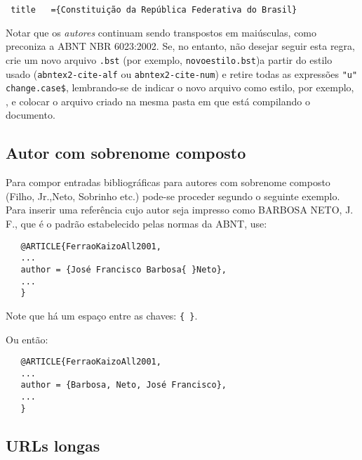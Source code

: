 \documentclass[a4paper]{ltxdoc}
\begin{document}
\begin{verbatim}
 title   ={Constituição da República Federativa do Brasil}
\end{verbatim}

Notar que os \textit{autores} continuam sendo transpostos em maiúsculas, como preconiza a ABNT NBR 6023:2002. Se, no entanto, não desejar seguir esta regra, crie um novo arquivo \verb|.bst| (por exemplo, \verb|novoestilo.bst|)a partir do estilo usado (\verb|abntex2-cite-alf| ou \verb|abntex2-cite-num|) e retire todas as expressões \verb|"u" change.case$|, lembrando-se de indicar o novo arquivo como estilo, por exemplo, \verb||, e colocar o arquivo criado na mesma pasta em que está compilando o documento.



\subsection{Autor com sobrenome composto}

Para compor entradas bibliográficas para autores com sobrenome composto (Filho, Jr.,Neto, Sobrinho etc.) pode-se proceder segundo o seguinte exemplo.
Para inserir uma referência cujo autor seja impresso como BARBOSA NETO, J. F., que é o padrão estabelecido pelas normas da ABNT, use:

\begin{verbatim}
   @ARTICLE{FerraoKaizoAll2001,
   ...
   author = {José Francisco Barbosa{ }Neto},
   ...
   }
\end{verbatim}

Note que há um espaço entre as chaves: \verb+{ }+.
   
Ou então:

\begin{verbatim}
   @ARTICLE{FerraoKaizoAll2001,
   ...
   author = {Barbosa, Neto, José Francisco},
   ...
   }

\end{verbatim}

\subsection{URLs longas}
\end{document}
